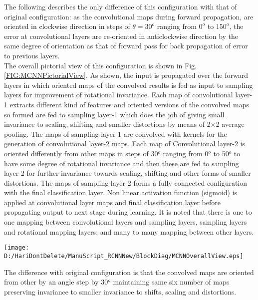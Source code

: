  
 The following describes the only difference of this configuration with that of original configuration: as the convolutional maps during forward propagation, are oriented in clockwise direction in steps of $\theta=30^o$ ranging from $0^o$ to $150^o$, the error at convolutional layers are re-oriented in anticlockwise direction by the same degree of orientation as that of forward pass for back propagation of error to previous layers.\\ 
 
 The overall pictorial view of this configuration is shown in Fig. \ref{FIG:MCNNPictorialView}. As shown, the input is propagated over the forward layers in which oriented maps of the convolved results is fed as input to sampling layers for improvement of rotational invariance. Each map of convolutional layer-1 extracts different kind of features and oriented versions of the convolved maps so formed are fed to sampling layer-1 which does the job of giving small invariance to scaling, shifting and smaller distortions by means of 2$\times$2 average pooling. The maps of sampling layer-1 are convolved with kernels for the generation of convolutional layer-2 maps. Each map of Convolutional layer-2 is oriented differently from other maps in steps of 30$^o$ ranging from 0$^o$ to 50$^o$ to have some degree of rotational invariance and then these are fed to sampling layer-2 for further invariance towards scaling, shifting and other forms of smaller distortions. The maps of sampling layer-2 forms a fully connected configuration with the final classification layer. Non linear activation function (sigmoid) is applied at convolutional layer maps and final classification layer before propagating output to next stage during learning. It is noted that there is one to one mapping between convolutional layers and sampling layers, sampling layers and rotational mapping layers; and many to many mapping between other layers. \\ 
 
 
\begin{figure*}
\centering
\texttt{[image: D:/HariDontDelete/ManuScript\_RCNNNew/BlockDiag/MCNNOverallView.eps]}
\caption{Pictorial view of the Convolved rotational maps at each layer : MCNN Configuration}
\label{FIG:MCNNPictorialView}
\end{figure*}
The difference with original configuration is that the convolved maps are oriented from other by an angle step by 30$^o$ maintaining same six number of maps preserving invariance to smaller invariance to shifts, scaling and distortions.\\
 
